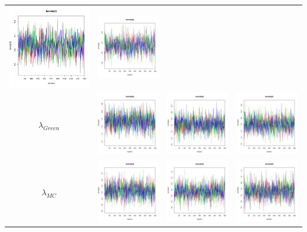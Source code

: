 \documentclass[letter,12pt]{article}
\begin{document}
\begin{table}
\begin{tabular}{cccc}
                        \includegraphics[width=.15\columnwidth]{../graphs/traceplots/2003d0vbar_3.pdf} &
                         \includegraphics[width=.15\columnwidth]{../graphs/traceplots/2003d0wbar_3.pdf} \\
    $\lambda_{Green}$  & \includegraphics[width=.15\columnwidth]{../graphs/traceplots/2003d0v_4.pdf} &
                        \includegraphics[width=.15\columnwidth]{../graphs/traceplots/2003d0vbar_4.pdf} &
                         \includegraphics[width=.15\columnwidth]{../graphs/traceplots/2003d0wbar_4.pdf} \\
    $\lambda_{MC}$    & \includegraphics[width=.15\columnwidth]{../graphs/traceplots/2003d0v_5.pdf} &
                        \includegraphics[width=.15\columnwidth]{../graphs/traceplots/2003d0vbar_5.pdf} &
                         \includegraphics[width=.15\columnwidth]{../graphs/traceplots/2003d0wbar_5.pdf} \\

\end{tabular}
\end{table}
\end{document}
